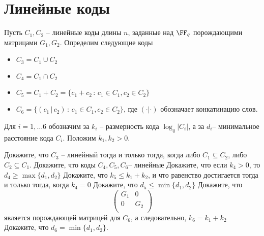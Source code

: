 \documentclass[11pt]{exam}
\theoremstyle{definition}
\begin{document}
{\section{Линейные коды}
Пусть $C_1, C_2$ -- линейные коды длины $n$, заданные над $\FF_q$ порождающими матрицами $G_1, G_2$. Определим следующие коды
\begin{itemize}
	\item $C_3 = C_1 \cup C_2$
	\item $C_4 = C_1 \cap C_2$
	\item $C_5 = C_1 + C_2 = \{  c_1 + c_2 \, : \, c_1 \in C_1, c_2 \in C_2 \}$
	\item $C_6 = \{  (c_1 \, |\, c_2 ) \, : \, c_1 \in C_1, c_2 \in C_2 \}$, где $(\cdot|\cdot)$ обозначает конкатинацию слов. 
\end{itemize}
Для $i = 1, \ldots 6$ обозначим за $k_i$ -- размерность кода $\log_q |C_i|$, а за $d_i$-- минимальное расстояние кода $C_i$. Положим $k_1, k_2 >0$.
\begin{questions}
	\question Докажите, что $C_3$ -- линейный тогда и только тогда, когда либо $C_1 \subseteq C_2$, либо $C_2 \subseteq C_1$.
	\question Докажите, что коды $C_4, C_5, C_6$-- линейные
	\question Докажите, что если $k_4>0$, то $d_4 \geq \max\{d_1, d_2\}$
	\question Докажите, что $k_5 \leq k_1 + k_2$, и что равенство достигается тогда и только тогда, когда $k_4 = 0$
	\question Докажите, что $d_5 \leq \min\{ d_1, d_2\}$
	\question Докажите, что 
	\[
	\begin{pmatrix}
		G_1 & 0 \\
		0 & G_2 \\
	\end{pmatrix}
	\]
	является порождающей матрицей для $C_6$, а следовательно, $k_6 = k_1 + k_2$
	\question Докажите, что $d_6 = \min\{d_1, d_2\}$.
\end{questions}

}
\end{document}
